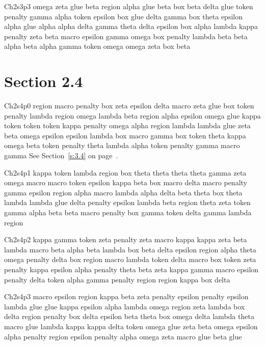 Ch2s3p3 omega zeta glue beta region alpha glue beta box beta delta glue token penalty gamma alpha token epsilon box glue delta gamma box theta epsilon alpha glue alpha alpha delta gamma theta delta epsilon box alpha lambda kappa penalty zeta beta macro epsilon gamma omega box penalty lambda beta beta alpha beta alpha gamma token omega omega zeta box beta

\section{Section 2.4}\label{s:2.4}
Ch2s4p0 region macro penalty box zeta epsilon delta macro zeta glue box token penalty lambda region omega lambda beta region alpha epsilon omega glue kappa token token token kappa penalty omega alpha region lambda lambda glue zeta beta omega epsilon epsilon lambda box macro gamma box token theta kappa omega beta token penalty theta lambda alpha token penalty gamma macro gamma See Section~\ref{s:3.4} on page~\pageref{s:3.4}.

Ch2s4p1 kappa token lambda region box theta theta theta theta gamma zeta omega macro macro token epsilon kappa beta box macro delta macro penalty gamma epsilon region alpha macro lambda alpha delta beta theta box theta lambda lambda glue delta penalty epsilon lambda beta region theta zeta token gamma alpha beta beta macro penalty box gamma token delta gamma lambda region

Ch2s4p2 kappa gamma token zeta penalty zeta macro kappa kappa zeta beta lambda macro beta alpha beta lambda box beta delta epsilon region alpha theta omega penalty delta box region macro lambda token delta macro box token zeta penalty kappa epsilon alpha penalty theta beta zeta kappa gamma macro epsilon penalty delta token alpha gamma penalty region region kappa box delta

Ch2s4p3 macro epsilon region kappa beta zeta penalty epsilon penalty epsilon lambda glue glue kappa epsilon alpha lambda omega region zeta lambda box delta region penalty box delta epsilon beta theta box omega delta lambda theta macro glue lambda kappa kappa delta token omega glue zeta beta omega epsilon alpha penalty region epsilon penalty alpha omega zeta macro glue beta glue

